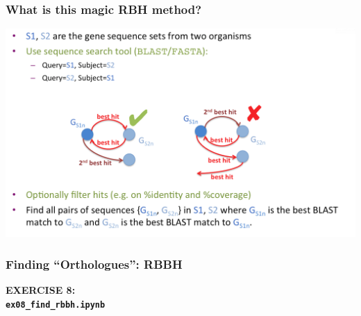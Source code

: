 
\begin{frame}
  \frametitle{What is this magic RBH method?}
  \begin{center}
      \includegraphics[width=1\textwidth]{images/rbbh}      
  \end{center}
\end{frame}

%
\begin{frame}
  \frametitle{Finding ``Orthologues'': RBBH}
  \Large{
    \textcolor{hutton_blue}{
      \textbf{
      EXERCISE 8: \\
      \texttt{ex08\_find\_rbbh.ipynb}
      }
    }
  }
\end{frame}